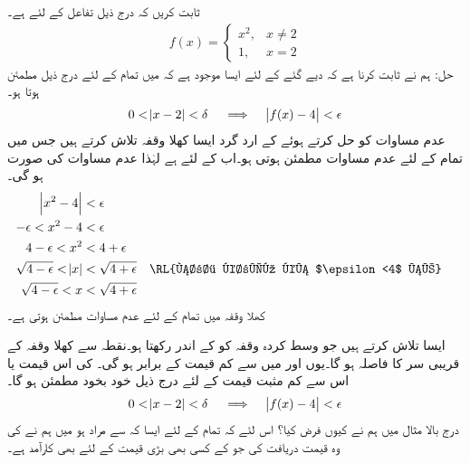 ثابت کریں کہ درج ذیل تفاعل کے لئے  ہے۔
\begin{align*}
f(x)=\begin{cases}
x^2,&x\ne 2\\
1,&x=2
\end{cases}
\end{align*}
حل:\quad
ہم نے ثابت کرنا ہے کہ دیے گئے  کے لئے ایسا  موجود ہے کہ  میں تمام  کے لئے درج ذیل مطمئن ہوتا ہو۔
\begin{align*}
0<\abs{x-2}<\delta\quad \implies \quad \abs{f(x)-4}<\epsilon
\end{align*}
\quad
عدم مساوات  کو حل کرتے ہوئے  کے ارد گرد ایسا کھلا وقفہ تلاش کرتے ہیں جس میں تمام  کے لئے عدم مساوات مطمئن ہوتی ہو۔اب  کے لئے  ہے لہٰذا عدم مساوات کی صورت  ہو گی۔ 
\begin{align*}
\abs{x^2-4}&<\epsilon\\
-\epsilon<x^2-4&<\epsilon\\
4-\epsilon<x^2&<4+\epsilon\\
\sqrt{4-\epsilon}<\abs{x}&<\sqrt{4+\epsilon}&&\text{\RL{فرض کریں کہ $\epsilon<4$ ہے}}\\
\sqrt{4-\epsilon}<x&<\sqrt{4+\epsilon}
\end{align*}
کھلا وقفہ  میں تمام  کے لئے عدم مساوات  مطمئن ہوتی ہے۔

\quad
ایسا  تلاش کرتے ہیں جو وسط کردہ وقفہ  کو  کے اندر رکھتا ہو۔نقطہ  سے کھلا وقفہ  کے قریبی سر کا فاصلہ  ہو گا۔یوں  اور   میں سے کم قیمت  کے برابر ہو گی۔ کی اس قیمت یا اس سے  کم مثبت قیمت کے لئے درج ذیل خود بخود مطمئن ہو گا۔
\begin{align*}
0<\abs{x-2}<\delta\quad \implies \quad \abs{f(x)-4}<\epsilon
\end{align*} 
درج بالا مثال میں ہم نے  کیوں فرض کیا؟ اس لئے کہ تمام  کے لئے ایسا  کہ  سے مراد  ہو میں ہم نے  کی وہ قیمت دریافت کی جو  کے کسی بھی  بڑی قیمت کے لئے بھی کارآمد ہے۔

